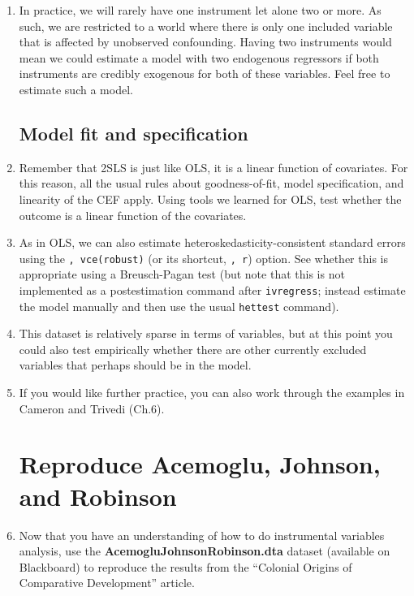 \documentclass[a4paper,12pt]{article}
\begin{document}
\begin{enumerate}
\item In practice, we will rarely have one instrument let alone two or more. As such, we are restricted to a world where there is only one included variable that is affected by unobserved confounding. Having two instruments would mean we could estimate a model with two endogenous regressors if both instruments are credibly exogenous for both of these variables. Feel free to estimate such a model.

\subsection*{Model fit and specification}

\item Remember that 2SLS is just like OLS, it is a linear function of covariates. For this reason, all the usual rules about goodness-of-fit, model specification, and linearity of the CEF apply. Using tools we learned for OLS, test whether the outcome is a linear function of the covariates.

\item As in OLS, we can also estimate heteroskedasticity-consistent standard errors using the \texttt{, vce(robust)} (or its shortcut, \texttt{, r}) option. See whether this is appropriate using a Breusch-Pagan test (but note that this is not implemented as a postestimation command after \texttt{ivregress}; instead estimate the model manually and then use the usual \texttt{hettest} command).

\item This dataset is relatively sparse in terms of variables, but at this point you could also test empirically whether there are other currently excluded variables that perhaps should be in the model.

\item If you would like further practice, you can also work through the examples in Cameron and Trivedi (Ch.6).

\section*{Reproduce Acemoglu, Johnson, and Robinson}


\item Now that you have an understanding of how to do instrumental variables analysis, use the \textbf{AcemogluJohnsonRobinson.dta} dataset (available on Blackboard) to reproduce the results from the ``Colonial Origins of Comparative Development'' article.


\end{enumerate}
\end{document}
